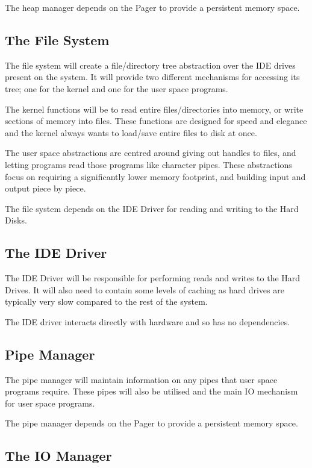 \documentclass[a4paper]{report}
\begin{document}
The heap manager depends on the Pager to provide a persistent memory space.

\subsection{The File System}

The file system will create a file/directory tree abstraction over the IDE drives present on the system. It will provide two different mechanisms for accessing its tree; one for the kernel and one for the user space programs.

The kernel functions will be to read entire files/directories into memory, or write sections of memory into files. These functions are designed for speed and elegance and the kernel always wants to load/save entire files to disk at once.

The user space abstractions are centred around giving out handles to files, and letting programs read those programs like character pipes. These abstractions focus on requiring a significantly lower memory footprint, and building input and output piece by piece.

The file system depends on the IDE Driver for reading and writing to the Hard Disks.

\subsection{The IDE Driver}

The IDE Driver will be responsible for performing reads and writes to the Hard Drives. It will also need to contain some levels of caching as hard drives are typically very slow compared to the rest of the system.

The IDE driver interacts directly with hardware and so has no dependencies.

\subsection{Pipe Manager}

The pipe manager will maintain information on any pipes that user space programs require. These pipes will also be utilised and the main IO mechanism for user space programs.

The pipe manager depends on the Pager to provide a persistent memory space.

\subsection{The IO Manager}
\end{document}
